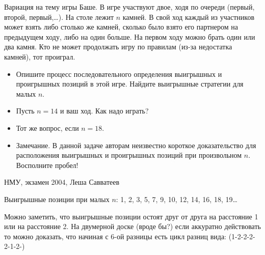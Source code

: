 \begin{problem}
Вариация на тему игры Баше. В игре участвуют двое, ходя по очереди (первый, второй, первый,\ldots ). На столе лежит $n$ камней. В свой ход каждый из участников может взять либо столько же камней, сколько было взято его партнером на предыдущем ходу, либо на один больше. На первом ходу можно брать один или два камня. Кто не может продолжать игру по правилам (из-за недостатка камней), тот проиграл.
\begin{itemize}
\item Опишите процесс последовательного определения выигрышных и проигрышных позиций в этой игре. Найдите выигрышные стратегии для малых $n$.
\item Пусть $n=14$ и ваш ход. Как надо играть?
\item  Тот же вопрос, если $n=18$.
\item Замечание. В данной задаче авторам неизвестно короткое доказательство для  расположения выигрышных и проигрышных позиций при произвольном $n$. Восполните пробел!
\end{itemize}



\begin{source}
НМУ, экзамен 2004, Леша Савватеев
\end{source}


\begin{sol}
Выигрышные позиции при малых $n$: 1, 2, 3, 5, 7, 9, 10, 12, 14, 16, 18, 19\ldots

Можно заметить, что выигрышные позиции остоят друг от друга на расстояние 1 или на расстояние 2. На двумерной доске (вроде бы?)  если аккуратно действовать то можно доказать, что начиная с 6-ой разницы есть цикл разниц вида: (1-2-2-2-2-1-2-)
\end{sol}
\end{problem}





